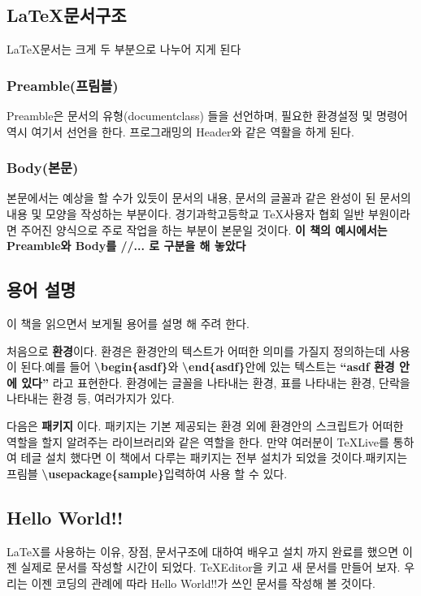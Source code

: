 \documentclass[12pt]{article}
\begin{document}
	\subsection{\LaTeX 문서구조}
	\LaTeX 문서는 크게 두 부분으로 나누어 지게 된다
	\subsubsection{Preamble(프림블)}
	Preamble은 문서의 유형(documentclass) 들을 선언하며, 필요한 환경설정 및 명령어 역시 여기서 선언을 한다. 프로그래밍의 Header와 같은 역활을 하게 된다.
	\subsubsection{Body(본문)}
	본문에서는 예상을 할 수가 있듯이 문서의 내용, 문서의 글꼴과 같은 완성이 된 문서의 내용 및 모양을 작성하는 부분이다. 경기과학고등학교  \TeX 사용자 협회 일반 부원이라면 주어진 양식으로 주로 작업을 하는 부분이 본문일 것이다.
	\newline
	\newline
	{\bf 이 책의 예시에서는 Preamble와 Body를 //... 로 구분을 해 놓았다}
	\subsection{용어 설명}
	이 책을 읽으면서 보게될 용어를 설명 해 주려 한다.
	
	처음으로 \textbf{환경}이다. 환경은 환경안의 텍스트가 어떠한 의미를 가질지 정의하는데 사용이 된다.예를 들어 \textbf{\textbackslash begin\{asdf\}}와 \textbf{\textbackslash end\{asdf\}}안에 있는 텍스트는 \textbf{``asdf 환경 안에 있다''} 라고 표현한다. 환경에는 글꼴을 나타내는 환경, 표를 나타내는 환경, 단락을 나타내는 환경 등, 여러가지가 있다.
	
	다음은 \textbf{패키지} 이다. 패키지는 기본 제공되는  환경 외에 환경안의 스크립트가 어떠한 역할을 할지 알려주는 라이브러리와 같은 역할을 한다. 만약 여러분이 \TeX Live를 통하여 테글 설치 했다면 이 책에서 다루는 패키지는 전부 설치가 되었을 것이다.패키지는 프림블 \textbf{\textbackslash usepackage\{sample\}}\를 입력하여 사용 할 수 있다.
	\clearpage
	\subsection{Hello World!!}
	\LaTeX 를 사용하는 이유, 장점, 문서구조에 대하여 배우고 설치 까지 완료를 했으면 이젠 실제로 문서를 작성할 시간이 되었다. \TeX Editor을 키고 새 문서를 만들어 보자. 우리는 이젠 코딩의 관례에 따라 Hello World!!가 쓰인 문서를 작성해 볼 것이다.\newline
	
\end{document}
